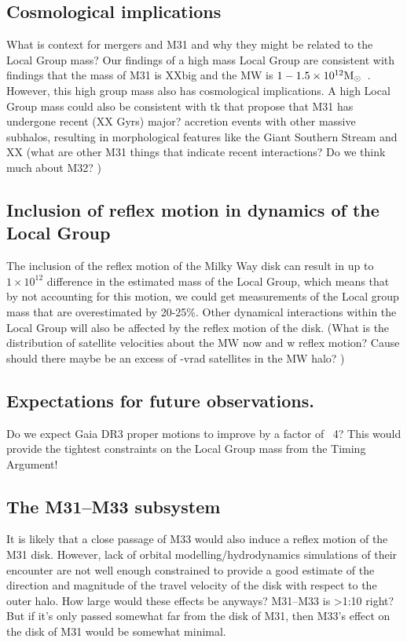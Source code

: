 \documentclass[twocolumn]{aastex631}
\begin{document}
\subsection{Cosmological implications}
What is context for mergers and M31 and why they might be 
related to the Local Group mass?
Our findings of a high mass Local Group are consistent with findings that the 
mass of M31 is XXbig and the MW is $1-1.5\times10^{12}\mathrm{M}_\odot$~\citep{??}. 
However, this high group mass also has cosmological implications. 
A high Local Group mass could also be consistent with tk that propose that M31 
has undergone recent (XX Gyrs) major? accretion events with other massive 
subhalos, resulting in morphological features like the Giant Southern Stream and 
XX (what are other M31 things that indicate recent interactions? Do we think 
much about M32? ) 

\subsection{Inclusion of reflex motion in dynamics of the Local Group}
The inclusion of the reflex motion of the Milky Way disk can result in up to 
$1\times10^{12}$ difference in the estimated mass of the Local Group, which 
means that by not accounting for this motion, we could get measurements of the 
Local group mass that are overestimated by 20-25\%.
Other dynamical interactions within the Local Group will also be affected by 
the reflex motion of the disk. (What is the distribution of satellite velocities 
about the MW now and w reflex motion? Cause should there maybe be an excess of 
-vrad satellites in the MW halo? )


\subsection{Expectations for future observations.}
Do we expect Gaia DR3 proper motions to improve by a factor of ~4? 
This would provide the tightest constraints on the Local Group mass from the 
Timing Argument! 

\subsection{The M31--M33 subsystem}
It is likely that a close passage of M33 would also induce a reflex motion of 
the M31 disk. 
However, lack of orbital modelling/hydrodynamics simulations of their encounter 
are not well enough constrained to provide a good estimate of the direction and 
magnitude of the travel velocity of the disk with respect to the outer halo. 
How large would these effects be anyways? M31--M33 is >1:10 right? But if it's 
only passed somewhat far from the disk of M31, then M33's effect on the disk 
of M31 would be somewhat minimal. 
\end{document}
